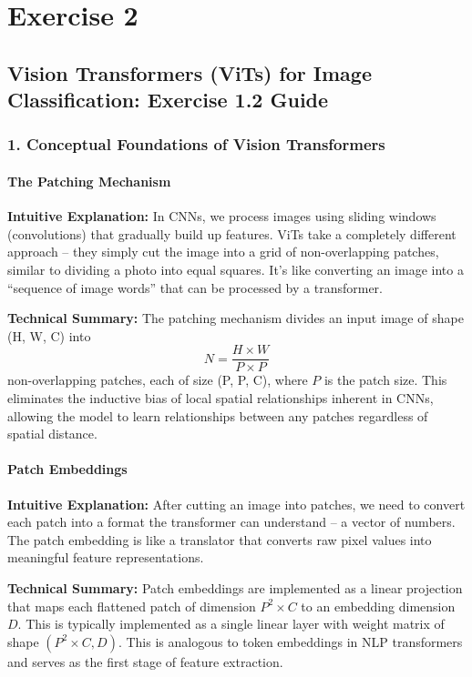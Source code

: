 \chapter{\normalsize Exercise 2}

\section*{Vision Transformers (ViTs) for Image Classification: Exercise 1.2 Guide}

\subsection*{1. Conceptual Foundations of Vision Transformers}

\subsubsection*{The Patching Mechanism}

\textbf{Intuitive Explanation:} In CNNs, we process images using sliding windows (convolutions) that gradually build up features. ViTs take a completely different approach -- they simply cut the image into a grid of non-overlapping patches, similar to dividing a photo into equal squares. It's like converting an image into a ``sequence of image words'' that can be processed by a transformer.

\textbf{Technical Summary:} The patching mechanism divides an input image of shape (H, W, C) into 
\[
N = \frac{H \times W}{P \times P}
\]
non-overlapping patches, each of size (P, P, C), where $P$ is the patch size. This eliminates the inductive bias of local spatial relationships inherent in CNNs, allowing the model to learn relationships between any patches regardless of spatial distance.

\subsubsection*{Patch Embeddings}

\textbf{Intuitive Explanation:} After cutting an image into patches, we need to convert each patch into a format the transformer can understand -- a vector of numbers. The patch embedding is like a translator that converts raw pixel values into meaningful feature representations.

\textbf{Technical Summary:} Patch embeddings are implemented as a linear projection that maps each flattened patch of dimension $P^2 \times C$ to an embedding dimension $D$. This is typically implemented as a single linear layer with weight matrix of shape $(P^2 \times C, D)$. This is analogous to token embeddings in NLP transformers and serves as the first stage of feature extraction.

